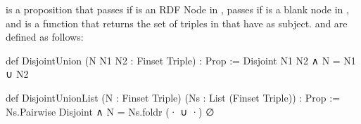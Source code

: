  is a proposition that passes if  
 is an RDF Node in , 
  passes if  
 is a blank node in , 
 and  is a function that returns the set of triples in 
 that have  as subject.  and  are defined as follows:

\begin{leanlisting}
def DisjointUnion (N N1 N2 : Finset Triple) : Prop :=
  Disjoint N1 N2 ∧ N = N1 ∪ N2

def DisjointUnionList (N : Finset Triple) 
                      (Ns : List (Finset Triple)) : Prop :=
  Ns.Pairwise Disjoint ∧ N = Ns.foldr (· ∪ ·) ∅
\end{leanlisting}

  

